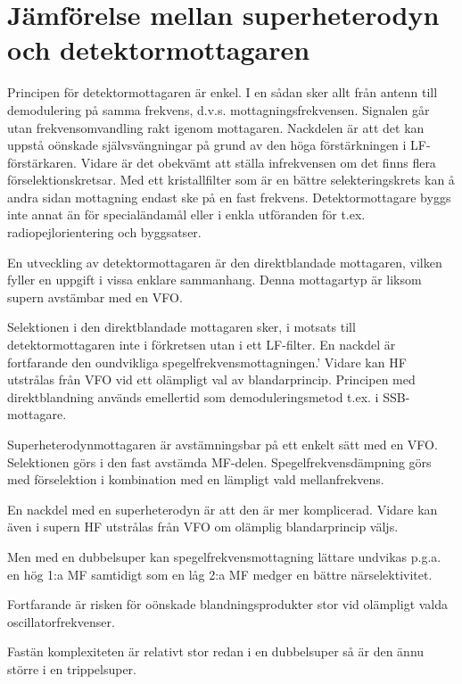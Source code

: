 \section[Jämförelse superheterodyn]{Jämförelse mellan superheterodyn och detektormottagaren}
\label{superheterojämförelse}

Principen för detektormottagaren är enkel.
I en sådan sker allt från antenn till demodulering på samma frekvens,
d.v.s. mottagningsfrekvensen.
Signalen går utan frekvensomvandling rakt igenom mottagaren.
Nackdelen är att det kan uppstå oönskade självsvängningar på grund av den
höga förstärkningen i LF-förstärkaren.
Vidare är det obekvämt att ställa infrekvensen om det finns flera
förselektionskretsar.
Med ett kristallfilter som är en bättre selekteringskrets kan å andra sidan
mottagning endast ske på en fast frekvens.
Detektormottagare byggs inte annat än för specialändamål eller i enkla
utföranden för t.ex. radiopejlorientering och byggsatser.

En utveckling av detektormottagaren är den direktblandade mottagaren,
vilken fyller en uppgift i vissa enklare sammanhang.
Denna mottagartyp är liksom supern avstämbar med en VFO.

Selektionen i den direktblandade mottagaren sker, i motsats till
detektormottagaren inte i förkretsen utan i ett LF-filter.
En nackdel är fortfarande den oundvikliga spegelfrekvensmottagningen.'
Vidare kan HF utstrålas från VFO vid ett olämpligt val av blandarprincip.
Principen med direktblandning används emellertid som demoduleringsmetod t.ex.
i SSB-mottagare.

Superheterodynmottagaren är avstämningsbar på ett enkelt sätt med en VFO.
Selektionen görs i den fast avstämda MF-delen.
Spegelfrekvensdämpning görs med förselektion i kombination med en lämpligt
vald mellanfrekvens.

En nackdel med en superheterodyn är att den är mer komplicerad.
Vidare kan även i supern HF utstrålas från VFO om olämplig blandarprincip väljs.

Men med en dubbelsuper kan spegelfrekvensmottagning lättare undvikas
p.g.a. en hög 1:a MF samtidigt som en låg 2:a MF medger en bättre
närselektivitet.

Fortfarande är risken för oönskade blandningsprodukter stor vid
olämpligt valda oscillatorfrekvenser.

Fastän komplexiteten är relativt stor redan i en dubbelsuper så är den
ännu större i en trippelsuper.
